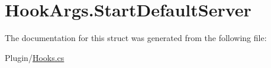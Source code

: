 \hypertarget{structOTA_1_1Plugin_1_1HookArgs_1_1StartDefaultServer}{}\section{Hook\+Args.\+Start\+Default\+Server}
\label{structOTA_1_1Plugin_1_1HookArgs_1_1StartDefaultServer}


The documentation for this struct was generated from the following file\+:\begin{DoxyCompactItemize}
\item 
Plugin/\hyperlink{Hooks_8cs}{Hooks.\+cs}\end{DoxyCompactItemize}

